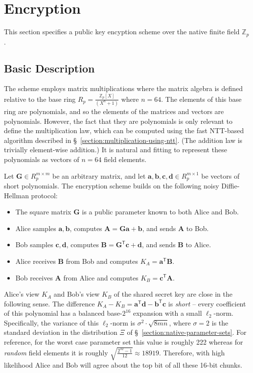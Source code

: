 
\section{Encryption}
\label{section:encryption}

This section specifies a public key encyption scheme over the native finite field $\mathbb{Z}_p$. 

\subsection{Basic Description}

The scheme employs matrix multiplications where the matrix algebra is defined relative to the base ring $R_p = \frac{\mathbb{Z}_p[X]}{(X^n + 1)}$ where $n=64$. The elements of this base ring are polynomials, and so the elements of the matrices and vectors are polynomials. However, the fact that they are polynomials is only relevant to define the multiplication law, which can be computed using the fast NTT-based algorithm described in \S~\ref{section:multiplication-using-ntt}. (The addition law is trivially element-wise addition.) It is natural and fitting to represent these polynomials as vectors of $n=64$ field elements.

Let $\mathbf{G} \in R_p^{m \times m}$ be an arbitrary matrix, and let $\mathbf{a}, \mathbf{b}, \mathbf{c}, \mathbf{d} \in R_p^{m \times 1}$ be vectors of short polynomials. The encryption scheme builds on the following noisy Diffie-Hellman protocol:
\begin{itemize}
\item The square matrix $\mathbf{G}$ is a public parameter known to both Alice and Bob.
\item Alice samples $\mathbf{a}, \mathbf{b}$, computes $\mathbf{A} = \mathbf{G} \mathbf{a} + \mathbf{b}$, and sends $\mathbf{A}$ to Bob.
\item Bob samples $\mathbf{c}, \mathbf{d}$, computes $\mathbf{B} = \mathbf{G}^\mathsf{T} \mathbf{c} + \mathbf{d}$, and sends $\mathbf{B}$ to Alice.
\item Alice receives $\mathbf{B}$ from Bob and computes $K_A = \mathbf{a}^\mathsf{T} \mathbf{B}$.
\item Bob receives $\mathbf{A}$ from Alice and computes $K_B = \mathbf{c}^\mathsf{T} \mathbf{A}$.
\end{itemize}
Alice's view $K_A$ and Bob's view $K_B$ of the shared secret key are close in the following sense. The difference $K_A - K_B = \mathbf{a}^\mathsf{T} \mathbf{d} - \mathbf{b}^\mathsf{T} \mathbf{c}$ is \emph{short} -- every coefficient of this polynomial has a balanced base-$2^{16}$ expansion with a small $\ell_2$-norm. Specifically, the variance of this $\ell_2$-norm is $\sigma^2 \cdot \sqrt{8mn}$, where $\sigma=2$ is the standard deviation in the distribution $\Xi$ of \S~\ref{section:native-parameter-sets}. For reference, for the worst case parameter set this value is roughly 222 whereas for \emph{random} field elements it is roughly $\sqrt{\frac{2^{32}-1}{12}} \approx 18919$. Therefore, with high likelihood Alice and Bob will agree about the top bit of all these 16-bit chunks. 

